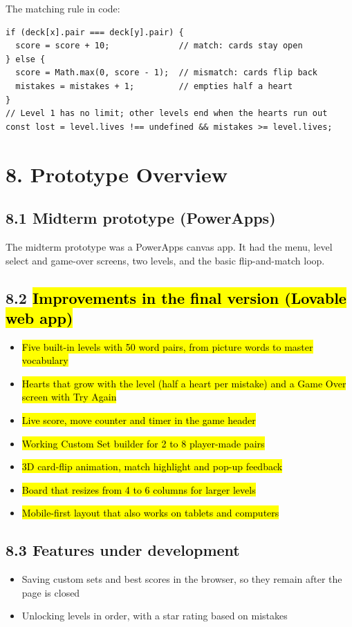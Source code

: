 \documentclass[11pt,a4paper]{article}
\begin{document}
The matching rule in code:
\begin{lstlisting}
if (deck[x].pair === deck[y].pair) {
  score = score + 10;              // match: cards stay open
} else {
  score = Math.max(0, score - 1);  // mismatch: cards flip back
  mistakes = mistakes + 1;         // empties half a heart
}
// Level 1 has no limit; other levels end when the hearts run out
const lost = level.lives !== undefined && mistakes >= level.lives;
\end{lstlisting}

\section{8. Prototype Overview}
\subsection*{8.1 Midterm prototype (PowerApps)}
The midterm prototype was a PowerApps canvas app. It had the menu, level select and game-over screens, two levels, and the basic flip-and-match loop.

\subsection*{8.2 \hl{Improvements in the final version (Lovable web app)}}
\begin{itemize}
  \item \hl{Five built-in levels with 50 word pairs, from picture words to master vocabulary}
  \item \hl{Hearts that grow with the level (half a heart per mistake) and a Game Over screen with Try Again}
  \item \hl{Live score, move counter and timer in the game header}
  \item \hl{Working Custom Set builder for 2 to 8 player-made pairs}
  \item \hl{3D card-flip animation, match highlight and pop-up feedback}
  \item \hl{Board that resizes from 4 to 6 columns for larger levels}
  \item \hl{Mobile-first layout that also works on tablets and computers}
\end{itemize}

\subsection*{8.3 Features under development}
\begin{itemize}
  \item Saving custom sets and best scores in the browser, so they remain after the page is closed
  \item Unlocking levels in order, with a star rating based on mistakes
\end{itemize}
\end{document}
